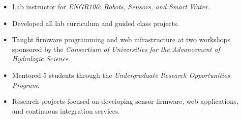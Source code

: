 \begin{itemize}
\item Lab instructor for \textit{ENGR100: Robots, Sensors, and Smart Water.}
\item Developed all lab curriculum and guided class projects.
\end{itemize}

\divider


\begin{itemize}
\item Taught firmware programming and web infrastructure at two workshops sponsored
  by the \textit{Consortium of Universities for the Advancement of Hydrologic Science}.
\end{itemize}

\divider


\begin{itemize}
\item Mentored 5 students through the \textit{Undergraduate Research
    Opportunities Program}.
\item Research projects focused on developing sensor firmware, web applications,
  and continuous integration services.
\end{itemize}